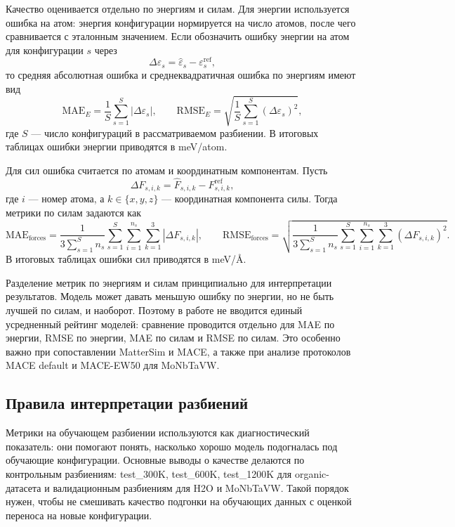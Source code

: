 Качество оценивается отдельно по энергиям и силам. Для энергии используется ошибка на атом: энергия конфигурации нормируется на число атомов, после чего сравнивается с эталонным значением. Если обозначить ошибку энергии на атом для конфигурации $s$ через
\[
\Delta \varepsilon_s
=
\widehat{\varepsilon}_s - \varepsilon_s^{\mathrm{ref}},
\]
то средняя абсолютная ошибка и среднеквадратичная ошибка по энергиям имеют вид
\begin{equation}
\mathrm{MAE}_E
=
\frac{1}{S}\sum_{s=1}^{S} |\Delta \varepsilon_s|,
\qquad
\mathrm{RMSE}_E
=
\sqrt{\frac{1}{S}\sum_{s=1}^{S}(\Delta \varepsilon_s)^2},
\label{eq:energy_metrics}
\end{equation}
где $S$ — число конфигураций в рассматриваемом разбиении. В итоговых таблицах ошибки энергии приводятся в meV/atom.

Для сил ошибка считается по атомам и координатным компонентам. Пусть
\[
\Delta F_{s,i,k}
=
\widehat{F}_{s,i,k} - F_{s,i,k}^{\mathrm{ref}},
\]
где $i$ — номер атома, а $k \in \{x,y,z\}$ — координатная компонента силы. Тогда метрики по силам задаются как
\begin{equation}
\mathrm{MAE}_{\mathrm{forces}}
=
\frac{1}{3\sum_{s=1}^{S} n_s}
\sum_{s=1}^{S}\sum_{i=1}^{n_s}\sum_{k=1}^{3}
|\Delta F_{s,i,k}|,
\qquad
\mathrm{RMSE}_{\mathrm{forces}}
=
\sqrt{
\frac{1}{3\sum_{s=1}^{S} n_s}
\sum_{s=1}^{S}\sum_{i=1}^{n_s}\sum_{k=1}^{3}
(\Delta F_{s,i,k})^2
}.
\label{eq:force_metrics}
\end{equation}
В итоговых таблицах ошибки сил приводятся в meV/Å.

Разделение метрик по энергиям и силам принципиально для интерпретации результатов. Модель может давать меньшую ошибку по энергии, но не быть лучшей по силам, и наоборот. Поэтому в работе не вводится единый усредненный рейтинг моделей: сравнение проводится отдельно для MAE по энергии, RMSE по энергии, MAE по силам и RMSE по силам. Это особенно важно при сопоставлении MatterSim и MACE, а также при анализе протоколов MACE default и MACE-EW50 для MoNbTaVW.

\subsection{Правила интерпретации разбиений}

Метрики на обучающем разбиении используются как диагностический показатель: они помогают понять, насколько хорошо модель подогналась под обучающие конфигурации. Основные выводы о качестве делаются по контрольным разбиениям: test\_300K, test\_600K, test\_1200K для organic-датасета и валидационным разбиениям для H2O и MoNbTaVW. Такой порядок нужен, чтобы не смешивать качество подгонки на обучающих данных с оценкой переноса на новые конфигурации.

